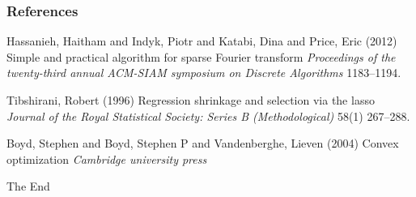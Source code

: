\documentclass{beamer}
\begin{document}

\begin{frame}
\frametitle{References}
\footnotesize{
\begin{thebibliography}{99} %
 Hassanieh, Haitham and Indyk, Piotr and Katabi, Dina and Price, Eric (2012)
\newblock Simple and practical algorithm for sparse Fourier transform
\newblock \emph{Proceedings of the twenty-third annual ACM-SIAM symposium on Discrete Algorithms} 1183--1194.

 Tibshirani, Robert (1996)
\newblock Regression shrinkage and selection via the lasso
\newblock \emph{Journal of the Royal Statistical Society: Series B (Methodological)} 58(1) 267--288.

 Boyd, Stephen and Boyd, Stephen P and Vandenberghe, Lieven (2004)
\newblock Convex optimization
\newblock \emph{Cambridge university press}
\end{thebibliography}
}
\end{frame}


\begin{frame}
\Huge{\centerline{The End}}
\end{frame}

\end{document}
